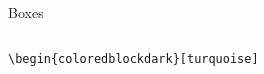 \documentclass[aspectratio=169]{beamer}
\begin{document}
\begin{frame}{Boxes}
\begin{columns}
\begin{column}{0.49\textwidth}
        \end{column}
    \end{columns}

    \centering
    \begin{minipage}[t]{0.49\textwidth}
        \begin{coloredblockdark}[turquoise]
                \footnotesize\texttt{\textbackslash begin\{coloredblockdark\}[turquoise]}\strut
        \end{coloredblockdark}
        
    \end{minipage}
\end{frame}


        


    

        
\end{document}
